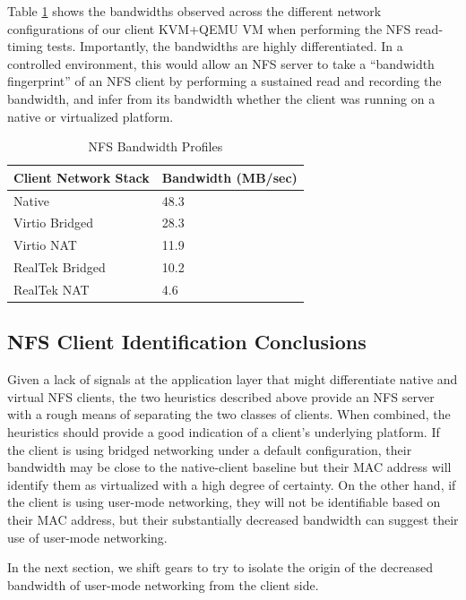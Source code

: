 \documentclass[letterpaper,twocolumn,11pt]{article}
\begin{document}
Table \ref{tab:NFSBandwidthProfiles} shows the bandwidths observed across the different network configurations of our client KVM+QEMU VM when performing the NFS read-timing tests. Importantly, the bandwidths are highly differentiated. In a controlled environment, this would allow an NFS server to take a ``bandwidth fingerprint'' of an NFS client by performing a sustained read and recording the bandwidth, and infer from its bandwidth whether the client was running on a native or virtualized platform. 

\begin{table}[htpb]
		\begin{tabular}{|l|l|}
			\hline
			\textbf{Client Network Stack} & \textbf{Bandwidth} (MB/sec) \\
			\hline
			Native & 48.3 \\
			Virtio Bridged & 28.3 \\
			Virtio NAT & 11.9 \\
			RealTek Bridged & 10.2 \\
			RealTek NAT & 4.6 \\
			\hline
		\end{tabular}
	\caption{NFS Bandwidth Profiles}
	\label{tab:NFSBandwidthProfiles}
\end{table}

\subsection{NFS Client Identification Conclusions}
Given a lack of signals at the application layer that might differentiate native and virtual NFS clients, the two heuristics described above provide an NFS server with a rough means of separating the two classes of clients. When combined, the heuristics should provide a good indication of a client's underlying platform. If the client is using bridged networking under a default configuration, their bandwidth may be close to the native-client baseline but their MAC address will identify them as virtualized with a high degree of certainty. On the other hand, if the client is using user-mode networking, they will not be identifiable based on their MAC address, but their substantially decreased bandwidth can suggest their use of user-mode networking. 

In the next section, we shift gears to try to isolate the origin of the decreased bandwidth of user-mode networking from the client side.


\end{document}
